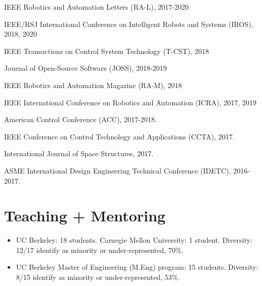 \documentclass[letterpaper]{deedy-resume} %
\begin{document}
{\begin{tightitemize}

\item IEEE Robotics and Automation Letters (RA-L), 2017-2020

\item IEEE/RSJ International Conference on Intelligent Robots and Systems (IROS), 2018, 2020

\item IEEE Transactions on Control System Technology (T-CST), 2018

\item Journal of Open-Source Software (JOSS), 2018-2019
  
\item IEEE Robotics and Automation Magazine (RA-M), 2018
  
\item IEEE International Conference on Robotics and Automation (ICRA), 2017, 2019

\item American Control Conference (ACC), 2017-2018.

\item IEEE Conference on Control Technology and Applications (CCTA), 2017.

\item International Journal of Space Structures, 2017.

\item ASME International Design Engineering Technical Conference (IDETC), 2016-2017.

\end{tightitemize}


\section{Teaching + Mentoring}

\vspace{0.2cm}

\begin{itemize}

\item {{} UC Berkeley: 18 students. Carnegie Mellon University: 1 student. Diversity: 12/17 identify as minority or under-represented, 70\%.}

\item {{} UC Berkeley Master of Engineering (M.Eng) program: 15 students. Diversity: 8/15 identify as minority or under-represented, 53\%.}


\end{itemize}}
\end{document}

